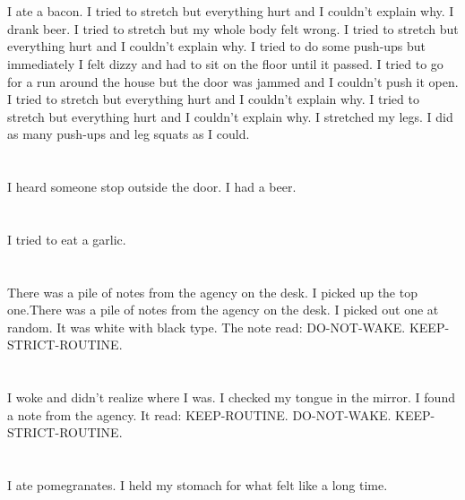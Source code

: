\documentclass{article}
\begin{document}
    \section{}
    I ate a bacon. I tried to stretch but everything hurt and I couldn't explain why. I drank beer.  I tried to stretch but my whole body felt wrong.  I tried to stretch but everything hurt and I couldn't explain why.  I tried to do some push-ups but immediately I felt dizzy and had to sit on the floor until it passed.  I tried to go for a run around the house but the door was jammed and I couldn't push it open.   I tried to stretch but everything hurt and I couldn't explain why.  I tried to stretch but everything hurt and I couldn't explain why.  I stretched my legs.  I did as many push-ups and leg squats as I could.  
    \newpage
    
    \section{}
    I heard someone stop outside the door. I had a beer.  
    \newpage
    
    \section{}
    I tried to eat a garlic.  
    \newpage
    
    \section{}
    There was a pile of notes from the agency on the desk. I picked up the top one.There was a pile of notes from the agency on the desk. I picked out one at random. It was white with black type. The note read: DO-NOT-WAKE. KEEP-STRICT-ROUTINE.  
    \newpage
    
    \section{}
    I woke and didn't realize where I was. I checked my tongue in the mirror. I found a note from the agency. It read: KEEP-ROUTINE. DO-NOT-WAKE. KEEP-STRICT-ROUTINE.  
    \newpage
    
    \section{}
    I ate pomegranates. I held my stomach for what felt like a long time.  
    \newpage
    
\end{document}
